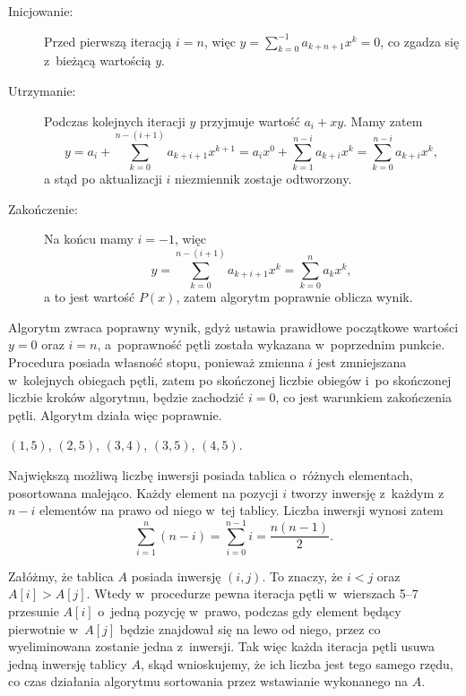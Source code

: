 \subproblem %
\begin{description}
	\item[Inicjowanie:] Przed pierwszą iteracją $i=n$, więc $y=\sum_{k=0}^{-1}a_{k+n+1}x^k=0$, co zgadza się z~bieżącą wartością $y$.
	\item[Utrzymanie:] Podczas kolejnych iteracji $y$ przyjmuje wartość $a_i+xy$. Mamy zatem
	\[
		y = a_i+\sum_{k=0}^{n-(i+1)}a_{k+i+1}x^{k+1} = a_ix^0+\sum_{k=1}^{n-i}a_{k+i}x^k = \sum_{k=0}^{n-i}a_{k+i}x^k,
	\]
	a stąd po aktualizacji $i$ niezmiennik zostaje odtworzony.
	\item[Zakończenie:] Na końcu mamy $i=-1$, więc
	\[
		y = \sum_{k=0}^{n-(i+1)}a_{k+i+1}x^k = \sum_{k=0}^na_kx^k,
	\]
	a to jest wartość $P(x)$, zatem algorytm poprawnie oblicza wynik.
\end{description}

\subproblem %
Algorytm zwraca poprawny wynik, gdyż ustawia prawidłowe początkowe wartości $y=0$ oraz $i=n$, a~poprawność pętli  została wykazana w~poprzednim punkcie. Procedura posiada własność stopu, ponieważ zmienna $i$ jest zmniejszana w~kolejnych obiegach pętli, zatem po skończonej liczbie obiegów i~po skończonej liczbie kroków algorytmu, będzie zachodzić $i=0$, co jest warunkiem zakończenia pętli. Algorytm działa więc poprawnie.


\subproblem %
$(1,5)$, $(2,5)$, $(3,4)$, $(3,5)$, $(4,5)$.

\subproblem %
Największą możliwą liczbę inwersji posiada tablica o~różnych elementach, posortowana malejąco. Każdy element na pozycji $i$ tworzy inwersję z~każdym z~$n-i$ elementów na prawo od niego w~tej tablicy. Liczba inwersji wynosi zatem
\[
	\sum_{i=1}^n(n-i) = \sum_{i=0}^{n-1}i = \frac{n(n-1)}{2}.
\]

\subproblem %
Załóżmy, że tablica $A$ posiada inwersję $(i,j)$. To znaczy, że $i<j$ oraz $A[i]>A[j]$. Wtedy w~procedurze  pewna iteracja pętli  w~wierszach 5\nobreakdash--7 przesunie $A[i]$ o~jedną pozycję w~prawo, podczas gdy element będący pierwotnie w~$A[j]$ będzie znajdował się na lewo od niego, przez co wyeliminowana zostanie jedna z~inwersji. Tak więc każda iteracja pętli  usuwa jedną inwersję tablicy $A$, skąd wnioskujemy, że ich liczba jest tego samego rzędu, co czas działania algorytmu sortowania przez wstawianie wykonanego na $A$.

